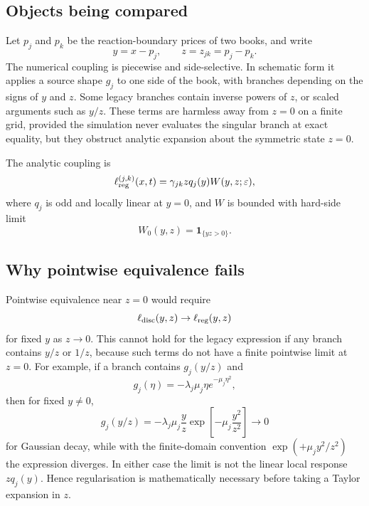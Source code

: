 \documentclass[5p,final]{elsarticle}
\begin{document}
\subsection{Objects being compared}

Let $p_j$ and $p_k$ be the reaction-boundary prices of two books, and write
\begin{equation}
y=x-p_j,
\qquad z=z_{jk}=p_j-p_k.
\end{equation}
The numerical coupling is piecewise and side-selective.  In schematic form it applies a source shape $g_j$ to one side of the book, with branches depending on the signs of $y$ and $z$.  Some legacy branches contain inverse powers of $z$, or scaled arguments such as $y/z$.  These terms are harmless away from $z=0$ on a finite grid, provided the simulation never evaluates the singular branch at exact equality, but they obstruct analytic expansion about the symmetric state $z=0$.

The analytic coupling is
\begin{equation}
\ell_{\rm reg}^{(j,k)}(x,t)
=\gamma_{jk}zq_j(y)W(y,z;\varepsilon),
\label{eq:eq-reg}
\end{equation}
where $q_j$ is odd and locally linear at $y=0$, and $W$ is bounded with hard-side limit
\begin{equation}
W_0(y,z)=\mathbf 1_{\{yz>0\}}.
\end{equation}

\subsection{Why pointwise equivalence fails}

Pointwise equivalence near $z=0$ would require
\begin{equation}
\ell_{\rm disc}(y,z)\to \ell_{\rm reg}(y,z)
\end{equation}
for fixed $y$ as $z\to0$.  This cannot hold for the legacy expression if any branch contains $y/z$ or $1/z$, because such terms do not have a finite pointwise limit at $z=0$.  For example, if a branch contains $g_j(y/z)$ and 
\begin{equation}
    g_j(\eta)=-\lambda_j\mu_j\eta e^{-\mu_j\eta^2},
\end{equation}
then for fixed $y\neq0$,
\begin{equation}
g_j(y/z)=-\lambda_j\mu_j\frac{y}{z}\exp\!\left[-\mu_j\frac{y^2}{z^2}\right]
\longrightarrow0
\end{equation}
for Gaussian decay, while with the finite-domain convention $\exp(+\mu_j y^2/z^2)$ the expression diverges.  In either case the limit is not the linear local response $zq_j(y)$.  Hence regularisation is mathematically necessary before taking a Taylor expansion in $z$.
\end{document}

